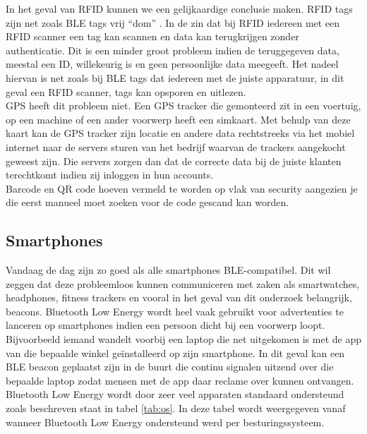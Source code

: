 In het geval van RFID kunnen we een gelijkaardige conclusie maken. RFID tags zijn net zoals BLE tags vrij “dom” \autocite{Juels2006}. In de zin dat bij RFID iedereen met een RFID scanner een tag kan scannen en data kan terugkrijgen zonder authenticatie. Dit is een minder groot probleem indien de teruggegeven data, meestal een ID, willekeurig is en geen persoonlijke data meegeeft. Het nadeel hiervan is net zoals bij BLE tags dat iedereen met de juiste apparatuur, in dit geval een RFID scanner, tags kan opsporen en uitlezen.\\

GPS heeft dit probleem niet. Een GPS tracker die gemonteerd zit in een voertuig, op een machine of een ander voorwerp heeft een simkaart. Met behulp van deze kaart kan de GPS tracker zijn locatie en andere data rechtstreeks via het mobiel internet naar de servers sturen van het bedrijf waarvan de trackers aangekocht geweest zijn. Die servers zorgen dan dat de correcte data bij de juiste klanten terechtkomt indien zij inloggen in hun accounts. \\

Barcode en QR code hoeven vermeld te worden op vlak van security aangezien je die eerst manueel moet zoeken voor de code gescand kan worden.


\subsection{Smartphones}
Vandaag de dag zijn zo goed als alle smartphones BLE-compatibel. Dit wil zeggen dat deze probleemloos kunnen communiceren met zaken als smartwatches, headphones, fitness trackers en vooral in het geval van dit onderzoek belangrijk, beacons. Bluetooth Low Energy wordt heel vaak gebruikt voor advertenties te lanceren op smartphones indien een persoon dicht bij een voorwerp loopt. Bijvoorbeeld iemand wandelt voorbij een laptop die net uitgekomen is met de app van die bepaalde winkel geïnstalleerd op zijn smartphone. In dit geval kan een BLE beacon geplaatst zijn in de buurt die continu signalen uitzend over die bepaalde laptop zodat mensen met de app daar reclame over kunnen ontvangen.\\

Bluetooth Low Energy wordt door zeer veel apparaten standaard ondersteund zoals beschreven staat in tabel \ref{tab:os}. In deze tabel wordt weergegeven vanaf wanneer Bluetooth Low Energy ondersteund werd per besturingssysteem.\\

